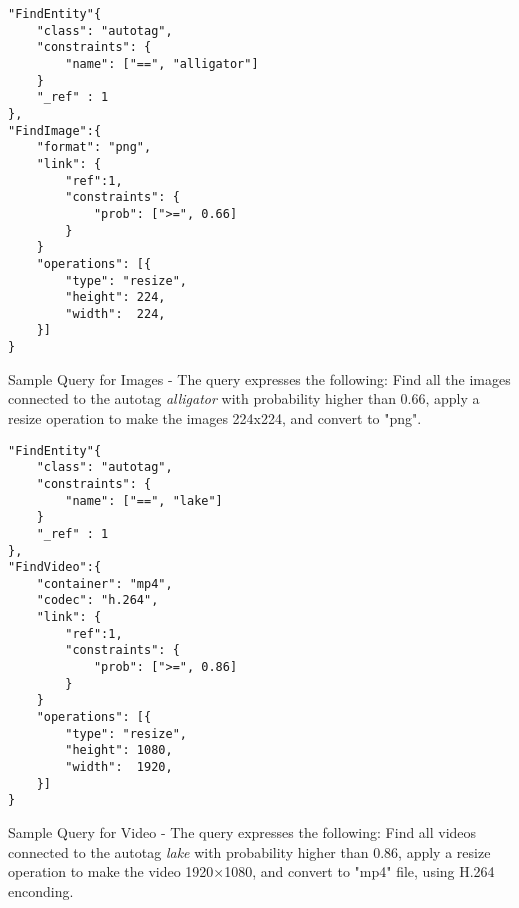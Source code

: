 \begin{appendix}

\begin{comment}
You can use an appendix for optional proofs or details of your evaluation which are not absolutely 
necessary to the core understanding of your paper.
\end{comment}

\begin{listing}[ht!]
\begin{verbatim}
"FindEntity"{     
    "class": "autotag",
    "constraints": { 
        "name": ["==", "alligator"]
    }
    "_ref" : 1
},
"FindImage":{
    "format": "png",
    "link": {
        "ref":1,
        "constraints": {
            "prob": [">=", 0.66]
        }
    }
    "operations": [{
        "type": "resize",
        "height": 224,
        "width":  224,
    }]
}

\end{verbatim}
\caption{Sample Query for Images - 
The query expresses the following: 
Find all the images connected to the autotag \textit{alligator} 
with probability higher than 0.66, apply a resize operation
to make the images 224x224, and convert to "png".} 
\label{findimage}
\end{listing}

\begin{listing}[ht!]
\begin{verbatim}
"FindEntity"{     
    "class": "autotag",
    "constraints": { 
        "name": ["==", "lake"]
    }
    "_ref" : 1
},
"FindVideo":{
    "container": "mp4",
    "codec": "h.264",
    "link": {
        "ref":1,
        "constraints": {
            "prob": [">=", 0.86]
        }
    }
    "operations": [{
        "type": "resize",
        "height": 1080,
        "width":  1920,
    }]
}

\end{verbatim}
\caption{Sample Query for Video - 
The query expresses the following: 
Find all videos connected to the autotag \textit{lake} 
with probability higher than 0.86, apply a resize operation
to make the video 1920×1080, and convert to "mp4" file, 
using H.264 enconding.} 
\label{findvideo}
\end{listing}


\end{appendix}
